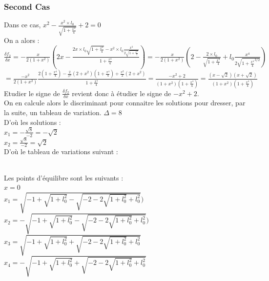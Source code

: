 \documentclass[10pt,a4paper]{article}
\begin{document}
\subsubsection*{Second Cas}
Dans ce cas, $x^2-\frac{x^2\times l_0}{\sqrt{1+\frac{x^4}{4}}}+2=0$\\
On a alors :\\
$\frac{\delta f_2}{\delta x}=-\frac{x}{2(1+x^2)}(2x-\frac{2x\times l_0\sqrt{1+\frac{x^4}{4}}-x^2\times l_0\frac{x^3}{2\sqrt{1+\frac{x^4}{4}}}}{1+\frac{x^4}{4}})=
-\frac{x}{2(1+x^2)}(2-\frac{2\times l_0}{\sqrt{1+\frac{x^4}{4}}}+l_0\frac{x^4}{2\sqrt{1+\frac{x^4}{4}^{3/2}}})$\\$= \frac{-x^2}{2(1+x^2)}\frac{2(1+\frac{x^4}{4})-\frac{2}{x^2}(2+x^2)(1+\frac{x^4}{4})+\frac{x^2}{2}(2+x^2)}{1+\frac{x^4}{4}}=\frac{-x^2+2}{(1+x^2)(1+\frac{x^4}{4})}=\frac{(x-\sqrt{2})(x+\sqrt{2})}{(1+x^2)(1+\frac{x^4}{4})}$\\
Etudier le signe de $\frac{\delta f_2}{\delta x}$ revient donc à étudier le signe de $-x^2+2$.\\
On en calcule alors le discriminant pour connaitre les solutions pour dresser, par la suite, un tableau de variation.
$\Delta = 8$\\
D'où les solutions :\\
$x_1 = -\frac{\sqrt{8}}{-2} = -\sqrt{2}$\\
$x_2 = \frac{\sqrt{8}}{-2} = \sqrt{2}$\\
D'où le tableau de variations suivant :\\
\\
Les points d'équilibre sont les suivants :\\
$x=0$\\
$x_1=\sqrt{-1+\sqrt{1+l_0^2}-\sqrt{-2-2\sqrt{1+l_0^2}+l_0^2}})$\\
$x_2=-\sqrt{-1+\sqrt{1+l_0^2}-\sqrt{-2-2\sqrt{1+l_0^2}+l_0^2}})$\\
$x_3=\sqrt{-1+\sqrt{1+l_0^2}+\sqrt{-2-2\sqrt{1+l_0^2}+l_0^2}}$\\
$x_4=-\sqrt{-1+\sqrt{1+l_0^2}+\sqrt{-2-2\sqrt{1+l_0^2}+l_0^2}}$\\
\end{document}
